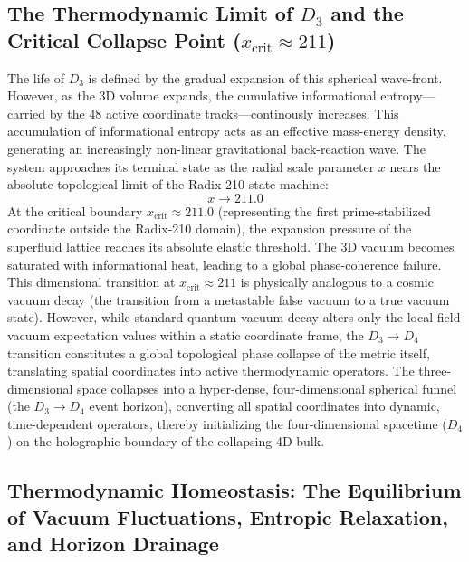 \documentclass[11pt,a4paper]{article}
\theoremstyle{plain}
\theoremstyle{definition}
\theoremstyle{remark}
\begin{document}
\subsection{The Thermodynamic Limit of $D_3$ and the Critical Collapse Point ($x_{\text{crit}} \approx 211$)}
The life of $D_3$ is defined by the gradual expansion of this spherical wave-front.
However, as the 3D volume expands, the cumulative informational entropy—carried by the 48 active coordinate tracks—continously increases.
This accumulation of informational entropy acts as an effective mass-energy density, generating an increasingly non-linear gravitational back-reaction wave.
The system approaches its terminal state as the radial scale parameter $x$ nears the absolute topological limit of the Radix-210 state machine:
\begin{equation}
x \to 211.0
\end{equation}
At the critical boundary $x_{\text{crit}} \approx 211.0$ (representing the first prime-stabilized coordinate outside the Radix-210 domain), the expansion pressure of the superfluid lattice reaches its absolute elastic threshold.
The 3D vacuum becomes saturated with informational heat, leading to a global phase-coherence failure.
This dimensional transition at $x_{\text{crit}} \approx 211$ is physically analogous to a cosmic vacuum decay (the transition from a metastable false vacuum to a true vacuum state).
However, while standard quantum vacuum decay alters only the local field vacuum expectation values within a static coordinate frame, the $D_3 \to D_4$ transition constitutes a global topological phase collapse of the metric itself, translating spatial coordinates into active thermodynamic operators.
The three-dimensional space collapses into a hyper-dense, four-dimensional spherical funnel (the $D_3 \to D_4$ event horizon), converting all spatial coordinates into dynamic, time-dependent operators, thereby initializing the four-dimensional spacetime ($D_4$) on the holographic boundary of the collapsing 4D bulk.

\newpage
\subsection{Thermodynamic Homeostasis: The Equilibrium of Vacuum Fluctuations, Entropic Relaxation, and Horizon Drainage}
\end{document}
